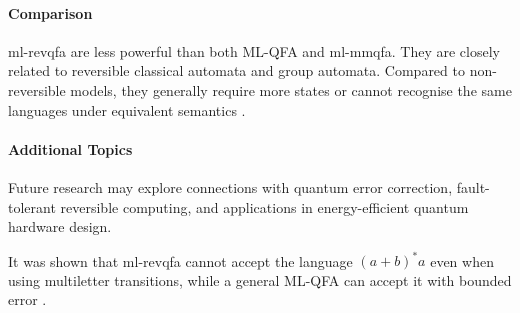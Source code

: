 \paragraph{Comparison}
\gls{ml-revqfa} are less powerful than both ML-QFA and \gls{ml-mmqfa}. They are closely related to reversible classical automata and group automata. Compared to non-reversible models, they generally require more states or cannot recognise the same languages under equivalent semantics \cite{belovs2007multi}.

\paragraph{Additional Topics}
Future research may explore connections with quantum error correction, fault-tolerant reversible computing, and applications in energy-efficient quantum hardware design.

\begin{example}
It was shown that \gls{ml-revqfa} cannot accept the language $(a+b)^*a$ even when using multiletter transitions, while a general ML-QFA can accept it with bounded error \cite{belovs2007multi}.
\end{example}
